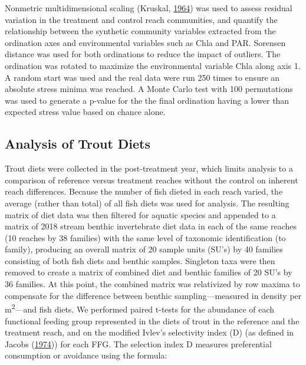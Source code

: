 \documentclass[double,12pt]{beavtex}
\begin{document}
  Nonmetric multidimensional scaling (Kruskal,
  \protect\hyperlink{ref-Kruskal1964}{1964}) was used to assess residual
  variation in the treatment and control reach communities, and quantify
  the relationship between the synthetic community variables extracted
  from the ordination axes and environmental variables such as Chla and
  PAR. Sorensen distance was used for both ordinations to reduce the
  impact of outliers. The ordination was rotated to maximize the
  environmental variable Chla along axis 1. A random start was used and
  the real data were run 250 times to ensure an absolute stress minima was
  reached. A Monte Carlo test with 100 permutations was used to generate a
  p-value for the the final ordination having a lower than expected stress
  value based on chance alone.
  
  \subsection*{Analysis of Trout Diets}\label{analysis-of-trout-diets}
  
  Trout diets were collected in the post-treatment year, which limits
  analysis to a comparison of reference versus treatment reaches without
  the control on inherent reach differences. Because the number of fish
  dieted in each reach varied, the average (rather than total) of all fish
  diets was used for analysis. The resulting matrix of diet data was then
  filtered for aquatic species and appended to a matrix of 2018 stream
  benthic invertebrate diet data in each of the same reaches (10 reaches
  by 38 families) with the same level of taxonomic identification (to
  family), producing an overall matrix of 20 sample units (SU's) by 40
  families consisting of both fish diets and benthic samples. Singleton
  taxa were then removed to create a matrix of combined diet and benthic
  families of 20 SU's by 36 families. At this point, the combined matrix
  was relativized by row maxima to compensate for the difference between
  benthic sampling---measured in density per m\textsuperscript{2}---and
  fish diets. We performed paired t-tests for the abundance of each
  functional feeding group represented in the diets of trout in the
  reference and the treatment reach, and on the modified Ivlev's
  selectivity index (D) (as defined in Jacobs
  (\protect\hyperlink{ref-Jacobs1974}{1974})) for each FFG. The selection
  index D measures preferential consumption or avoidance using the
  formula:
  
\end{document}
